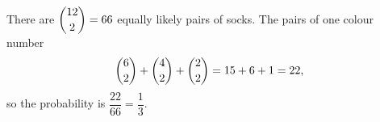 There are $\dbinom{12}{2}=66$ equally likely pairs of socks. The pairs of one colour number
\[\dbinom62+\dbinom42+\dbinom22=15+6+1=22,\]
so the probability is $\dfrac{22}{66}=\boxed{\dfrac{1}{3}}$.
